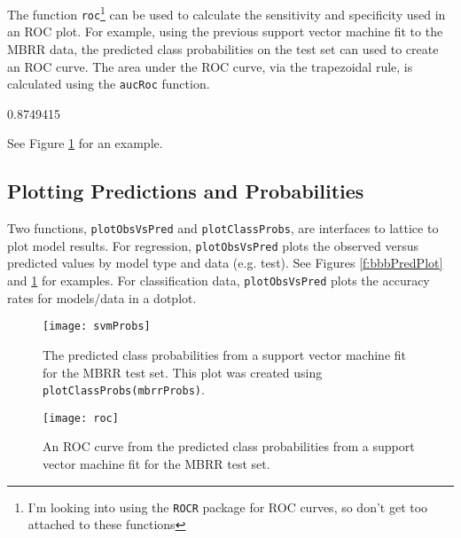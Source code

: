 \documentclass[12pt]{article}
\begin{document}
The function \texttt{roc}\footnote{I'm looking into using the \texttt{ROCR} package for ROC curves, so don't get too attached to these functions} can be used to calculate the sensitivity and specificity used in an ROC plot. For example, using the previous support vector machine fit to the MBRR data, the predicted class probabilities on the test set can used to create an ROC curve. The area under the ROC curve, via the trapezoidal rule, is calculated using the \texttt{aucRoc} function. 

\begin{small}
\begin{Schunk}
\begin{Soutput}
[1] 0.8749415
\end{Soutput}
\end{Schunk}
\end{small}

See Figure \ref{f:mbrrROC} for an example.

\subsection*{Plotting Predictions and Probabilities}

Two functions, \texttt{plotObsVsPred} and \texttt{plotClassProbs}, are interfaces to lattice to plot model results. For regression, \texttt{plotObsVsPred} plots the observed versus predicted values by model type and data (e.g. test). See Figures \ref{f:bbbPredPlot} and \ref{f:mbrrROC}  for examples. For classification data, \texttt{plotObsVsPred} plots the accuracy rates for models/data in a dotplot. 



\begin{figure}[ht]
   \begin{center}      
      \texttt{[image: svmProbs]}   
      \caption{The predicted class probabilities from a support vector machine fit for the MBRR test set. This plot was created using \texttt{plotClassProbs(mbrrProbs)}.}
      \label{f:mbrrProbs}         
      \vspace*{.5 in}      
       \texttt{[image: roc]}   
      \caption{An ROC curve from the predicted class probabilities from a support vector machine fit for the MBRR test set. }
      \label{f:mbrrROC}       
   \end{center}
\end{figure}  
\end{document}
